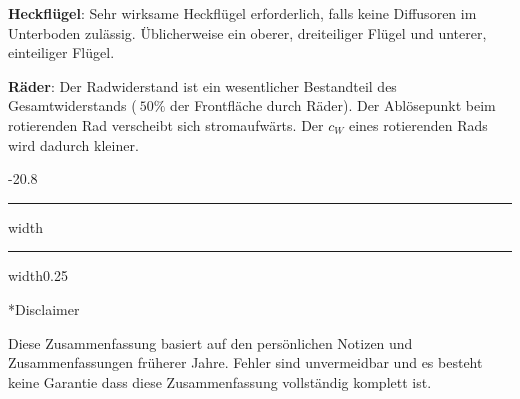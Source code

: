 \documentclass[8pt, landscape, fleqn]{scrartcl}
\makeatletter
\renewcommand{\subsection}{\@startsection{subsection}{1}{0mm}%
{-2\baselineskip}{0.8\baselineskip}%
{\hrule depth 0.2pt width\columnwidth\hrule depth0.75pt
width0.25\columnwidth\vspace*{1.2em}\large\bfseries\rmfamily}}
\makeatother
\begin{document}
\begin{multicols*}{3}
\textbf{Heckflügel}: Sehr wirksame Heckflügel erforderlich, falls keine Diffusoren im Unterboden zulässig. Üblicherweise ein oberer, dreiteiliger Flügel und unterer, einteiliger Flügel. \newline \newline

\textbf{Räder}: Der Radwiderstand ist ein wesentlicher Bestandteil des Gesamtwiderstands ($~50\%$ der Frontfläche durch Räder). Der Ablösepunkt beim rotierenden Rad verscheibt sich stromaufwärts. Der $c_W$ eines rotierenden Rads wird dadurch kleiner.  

\subsection*{Disclaimer}

Diese Zusammenfassung basiert auf den persönlichen Notizen und Zusammenfassungen früherer Jahre. Fehler sind unvermeidbar und es besteht keine Garantie dass diese Zusammenfassung vollständig komplett ist. 

\end{multicols*}
\end{document}
